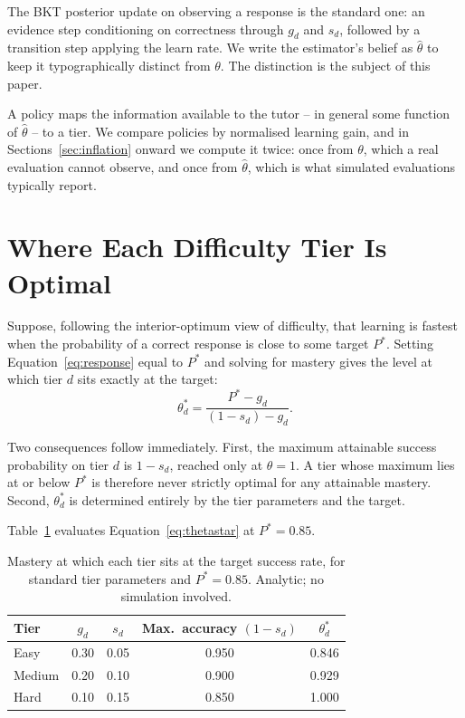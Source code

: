 \documentclass[notitlepage,12pt]{jedm}
\begin{document}
The BKT posterior update on observing a response is the standard one: an evidence step conditioning on correctness through $g_d$ and $s_d$, followed by a transition step applying the learn rate. We write the estimator's belief as $\hat{\theta}$ to keep it typographically distinct from $\theta$. The distinction is the subject of this paper.

A policy maps the information available to the tutor -- in general some function of $\hat{\theta}$ -- to a tier. We compare policies by normalised learning gain, and in Sections~\ref{sec:inflation} onward we compute it twice: once from $\theta$, which a real evaluation cannot observe, and once from $\hat{\theta}$, which is what simulated evaluations typically report.

\section{Where Each Difficulty Tier Is Optimal}
\label{sec:geometry}

Suppose, following the interior-optimum view of difficulty, that learning is fastest when the probability of a correct response is close to some target $P^{*}$. Setting Equation~\ref{eq:response} equal to $P^{*}$ and solving for mastery gives the level at which tier $d$ sits exactly at the target:
\begin{equation}
\theta^{*}_d = \frac{P^{*} - g_d}{(1 - s_d) - g_d}.
\label{eq:thetastar}
\end{equation}

Two consequences follow immediately. First, the maximum attainable success probability on tier $d$ is $1 - s_d$, reached only at $\theta = 1$. A tier whose maximum lies at or below $P^{*}$ is therefore never strictly optimal for any attainable mastery. Second, $\theta^{*}_d$ is determined entirely by the tier parameters and the target.

Table~\ref{tab:geometry} evaluates Equation~\ref{eq:thetastar} at $P^{*} = 0.85$.

\begin{table}[ht]
\centering
\caption{Mastery at which each tier sits at the target success rate, for standard tier parameters and $P^{*}=0.85$. Analytic; no simulation involved.}
\label{tab:geometry}
\begin{tabular}{lcccc}
\toprule
Tier & $g_d$ & $s_d$ & Max.\ accuracy $(1-s_d)$ & $\theta^{*}_d$ \\
\midrule
Easy   & 0.30 & 0.05 & 0.950 & 0.846 \\
Medium & 0.20 & 0.10 & 0.900 & 0.929 \\
Hard   & 0.10 & 0.15 & 0.850 & 1.000 \\
\bottomrule
\end{tabular}
\end{table}
\end{document}
